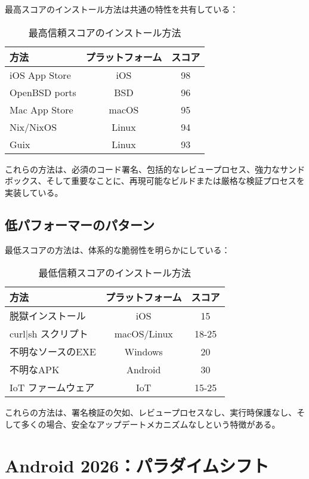 \documentclass[Specialissue]{jsaiart}
\begin{document}
最高スコアのインストール方法は共通の特性を共有している：

\begin{table}[ht]
\centering
\caption{最高信頼スコアのインストール方法}
\begin{tabular}{lcc}
\toprule
\rowcolor{headergray}
\textbf{方法} & \textbf{プラットフォーム} & \textbf{スコア} \\
\midrule
iOS App Store & iOS & 98 \\
OpenBSD ports & BSD & 96 \\
Mac App Store & macOS & 95 \\
Nix/NixOS & Linux & 94 \\
Guix & Linux & 93 \\
\bottomrule
\end{tabular}
\end{table}

これらの方法は、必須のコード署名、包括的なレビュープロセス、強力なサンドボックス、そして重要なことに、再現可能なビルドまたは厳格な検証プロセスを実装している。

\subsection{低パフォーマーのパターン}

最低スコアの方法は、体系的な脆弱性を明らかにしている：

\begin{table}[ht]
\centering
\caption{最低信頼スコアのインストール方法}
\begin{tabular}{lcc}
\toprule
\rowcolor{headergray}
\textbf{方法} & \textbf{プラットフォーム} & \textbf{スコア} \\
\midrule
脱獄インストール & iOS & 15 \\
curl|sh スクリプト & macOS/Linux & 18-25 \\
不明なソースのEXE & Windows & 20 \\
不明なAPK & Android & 30 \\
IoT ファームウェア & IoT & 15-25 \\
\bottomrule
\end{tabular}
\end{table}

これらの方法は、署名検証の欠如、レビュープロセスなし、実行時保護なし、そして多くの場合、安全なアップデートメカニズムなしという特徴がある。

\section{Android 2026：パラダイムシフト}
\end{document}

